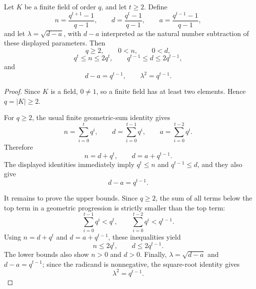 \begin{helper}
Let \(K\) be a finite field of order \(q\), and let \(t\ge2\).  Define
\[
  n=\frac{q^{t+1}-1}{q-1},\qquad
  d=\frac{q^t-1}{q-1},\qquad
  a=\frac{q^{t-1}-1}{q-1},
\]
and let \(\lambda=\sqrt{d-a}\), with \(d-a\) interpreted as the natural
number subtraction of these displayed parameters.  Then
\[
  q\ge2,\qquad 0<n,\qquad 0<d,
\]
\[
  q^t\le n\le2q^t,\qquad
  q^{t-1}\le d\le2q^{t-1},
\]
and
\[
  d-a=q^{t-1},\qquad \lambda^2=q^{t-1}.
\]
\end{helper}
\begin{proof}
Since \(K\) is a field, \(0\ne1\), so a finite field has at least two
elements.  Hence \(q=|K|\ge2\).

For \(q\ge2\), the usual finite geometric-sum identity gives
\[
  n=\sum_{i=0}^{t}q^i,\qquad
  d=\sum_{i=0}^{t-1}q^i,\qquad
  a=\sum_{i=0}^{t-2}q^i.
\]
Therefore
\[
  n=d+q^t,\qquad d=a+q^{t-1}.
\]
The displayed identities immediately imply \(q^t\le n\) and
\(q^{t-1}\le d\), and they also give
\[
  d-a=q^{t-1}.
\]

It remains to prove the upper bounds.  Since \(q\ge2\), the sum of all
terms below the top term in a geometric progression is strictly smaller
than the top term:
\[
  \sum_{i=0}^{t-1}q^i<q^t,\qquad
  \sum_{i=0}^{t-2}q^i<q^{t-1}.
\]
Using \(n=d+q^t\) and \(d=a+q^{t-1}\), these inequalities yield
\[
  n\le2q^t,\qquad d\le2q^{t-1}.
\]
The lower bounds also show \(n>0\) and \(d>0\).  Finally,
\(\lambda=\sqrt{d-a}\) and \(d-a=q^{t-1}\); since the radicand is
nonnegative, the square-root identity gives
\[
  \lambda^2=q^{t-1}.
\]
\end{proof}
